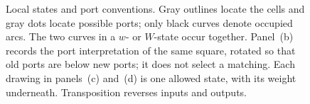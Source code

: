 \documentclass[11pt]{article}
\numberwithin{equation}{section}
\theoremstyle{definition}\newtheorem{definition}[theorem]{Definition}
\theoremstyle{remark}\newtheorem{remark}[theorem]{Remark}
\begin{document}
\begin{figure}[tbp]
\endgroup
\caption{Local states and port conventions. Gray outlines locate the cells
and gray dots locate possible ports; only black curves denote occupied
arcs. The two curves in a $w$- or $W$-state occur together. Panel~(b)
records the port interpretation of the same square, rotated so that old
ports are below new ports; it does not select a matching. Each drawing in
panels~(c) and~(d) is one allowed state, with its weight underneath.
Transposition reverses inputs and outputs.}
\label{L:fig:local-states}
\end{figure}
\end{document}
